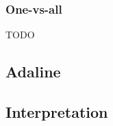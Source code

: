 \subsubsection{One-vs-all}
TODO

\newpage
\subsection{Adaline}
\begin{flushleft}
\end{flushleft}

\subsection{Interpretation}
\begin{flushleft}
\end{flushleft}




